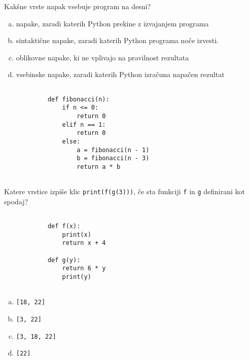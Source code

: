 \documentclass[arhiv, 10pt]{../izpit}
\newcommand{\inlinepy}[1]{\texttt{#1}}
\begin{document}
        \naloga*
        \begin{multicols}{2}
        \noindent
        Kakšne vrste napak vsebuje program na desni?

        \begin{enumerate}[(a)]
\item napake, zaradi katerih Python prekine z izvajanjem programa
\item sintaktične napake, zaradi katerih Python programa noče izvesti.
\item oblikovne napake, ki ne vplivajo na pravilnost rezultata
\item vsebinske napake, zaradi katerih Python izračuna napačen rezultat
\end{enumerate}

        \columnbreak

        \begin{verbatim}
        
            def fibonacci(n):
                if n <= 0:
                    return 0
                elif n == 1:
                    return 0
                else:
                    a = fibonacci(n - 1)
                    b = fibonacci(n - 3)
                    return a * b
            
        \end{verbatim}

        \end{multicols}

    
        \naloga*
        Katere vrstice izpiše klic \inlinepy{print(f(g(3)))}, če sta funkciji \inlinepy{f} in \inlinepy{g} definirani kot spodaj?

        \begin{multicols}{2}
        \begin{verbatim}
        
            def f(x):
                print(x)
                return x + 4

            def g(y):
                return 6 * y
                print(y)
        
        \end{verbatim}

        \begin{enumerate}[(a)]
\item \inlinepy{[18, 22]}
\item \inlinepy{[3, 22]}
\item \inlinepy{[3, 18, 22]}
\item \inlinepy{[22]}
\end{enumerate}

        \end{multicols}
    
\end{document}
